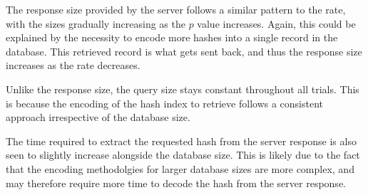 The response size provided by the server follows a similar pattern to the rate, with the
sizes gradually increasing as the $p$ value increases. Again, this could be explained by
the necessity to encode more hashes into a single record in the database. This retrieved
record is what gets sent back, and thus the response size increases as the rate decreases.

Unlike the response size, the query size stays constant throughout all trials. This is
because the encoding of the hash index to retrieve follows a consistent approach
irrespective of the database size.

The time required to extract the requested hash from the server response is also seen to
slightly increase alongside the database size. This is likely due to the fact that the
encoding methodolgies for larger database sizes are more complex, and may therefore
require more time to decode the hash from the server response.
